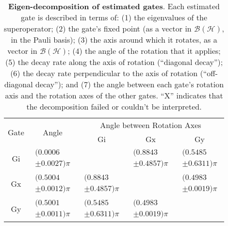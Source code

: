 \documentclass{article}[11pt]
\begin{document}
\begin{table}[h]
\begin{center}
\vspace{2em}
\begin{tabular}[l]{|c|c|c|c|c|}
\hline
\multirow{2}{*}{Gate} & \multirow{2}{*}{Angle} & \multicolumn{3}{c|}{Angle between Rotation Axes} \\ \cline{3-5}
 & & Gi & Gx & Gy \\ \hline
Gi & $ \begin{array}{c}(0.0006 \\ \pm 0.0027)\pi \end{array} $ &  & $ \begin{array}{c}(0.8843 \\ \pm 0.4857)\pi \end{array} $ & $ \begin{array}{c}(0.5485 \\ \pm 0.6311)\pi \end{array} $ \\ \hline
Gx & $ \begin{array}{c}(0.5004 \\ \pm 0.0012)\pi \end{array} $ & $ \begin{array}{c}(0.8843 \\ \pm 0.4857)\pi \end{array} $ &  & $ \begin{array}{c}(0.4983 \\ \pm 0.0019)\pi \end{array} $ \\ \hline
Gy & $ \begin{array}{c}(0.5001 \\ \pm 0.0011)\pi \end{array} $ & $ \begin{array}{c}(0.5485 \\ \pm 0.6311)\pi \end{array} $ & $ \begin{array}{c}(0.4983 \\ \pm 0.0019)\pi \end{array} $ &  \\ \hline
\end{tabular}

\caption{\textbf{Eigen-decomposition of estimated gates}.  Each estimated gate is described in terms of: (1) the eigenvalues of the superoperator; (2) the gate's fixed point (as a vector in $\mathcal{B}(\mathcal{H})$, in the Pauli basis); (3)  the axis around which it rotates, as a vector in $\mathcal{B}(\mathcal{H})$; (4) the angle of the rotation that it applies; (5) the decay rate along the axis of rotation (``diagonal decay''); (6) the decay rate perpendicular to the axis of rotation (``off-diagonal decay''); and (7) the angle between each gate's rotation axis and the rotation axes of the other gates.  ``X'' indicates that the decomposition failed or couldn't be interpreted. \label{bestGatesetDecompTable}}
\end{center}
\end{table}
\end{document}
